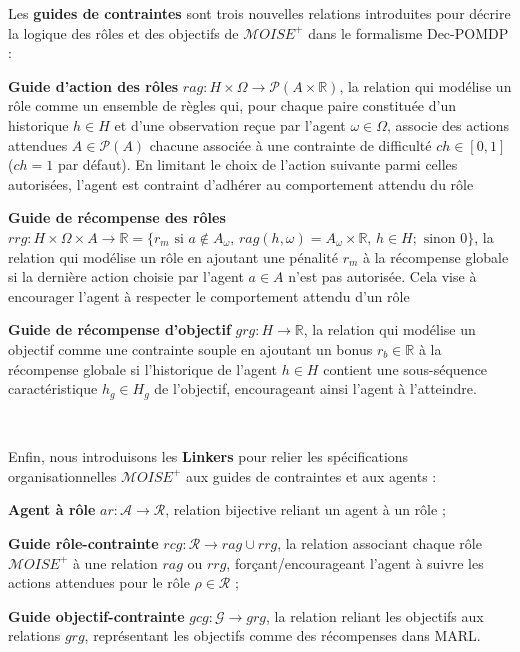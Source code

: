 \noindent Les \textbf{guides de contraintes} sont trois nouvelles relations introduites pour décrire la logique des rôles et des objectifs de $\mathcal{M}OISE^+$ dans le formalisme Dec-POMDP :
%
\begin{enumerate*}[label={\roman*) },itemjoin={; \quad}]

    \item \textbf{Guide d'action des rôles} \quad $rag : H \times \Omega \rightarrow \mathcal{P}(A \times \mathbb{R})$, la relation qui modélise un rôle comme un ensemble de règles qui, pour chaque paire constituée d'un historique $h \in H$ et d'une observation reçue par l'agent $\omega \in \Omega$, associe des actions attendues $A \in \mathcal{P}(A)$ chacune associée à une contrainte de difficulté $ch \in [0,1]$ ($ch = 1$ par défaut). En limitant le choix de l'action suivante parmi celles autorisées, l'agent est contraint d'adhérer au comportement attendu du rôle
    \item \textbf{Guide de récompense des rôles} \quad $rrg: H \times \Omega \times A \to \mathbb{R} = \{r_m \text{ si } a \notin A_\omega \text{, } rag(h, \omega) \allowbreak = \allowbreak A_\omega \times \mathbb{R} \text{, } h \in H; \text{ sinon } 0\}$, la relation qui modélise un rôle en ajoutant une pénalité $r_m$ à la récompense globale si la dernière action choisie par l'agent $a \in A$ n'est pas autorisée. Cela vise à encourager l'agent à respecter le comportement attendu d'un rôle
    \item \textbf{Guide de récompense d'objectif} \quad $grg: H \rightarrow \mathbb{R}$, la relation qui modélise un objectif comme une contrainte souple en ajoutant un bonus $r_b \in \mathbb{R}$ à la récompense globale si l'historique de l'agent $h \in H$ contient une sous-séquence caractéristique $h_g \in H_g$ de l'objectif, encourageant ainsi l'agent à l'atteindre.
\end{enumerate*}

\

\noindent Enfin, nous introduisons les \textbf{Linkers} pour relier les spécifications organisationnelles $\mathcal{M}OISE^+$ aux guides de contraintes et aux agents :
%
\begin{enumerate*}[label={\roman*) },itemjoin={; \quad}]

    \item \textbf{Agent à rôle} \quad $ar : \mathcal{A} \to \mathcal{R}$, relation bijective reliant un agent à un rôle ;
    \item \textbf{Guide rôle-contrainte} \quad $rcg: \mathcal{R} \rightarrow rag \cup rrg$, la relation associant chaque rôle $\mathcal{M}OISE^+$ à une relation $rag$ ou $rrg$, forçant/encourageant l'agent à suivre les actions attendues pour le rôle $\rho \in \mathcal{R}$ ;
    \item \textbf{Guide objectif-contrainte} \quad $gcg : \mathcal{G} \rightarrow grg$, la relation reliant les objectifs aux relations $grg$, représentant les objectifs comme des récompenses dans MARL.
\end{enumerate*}

